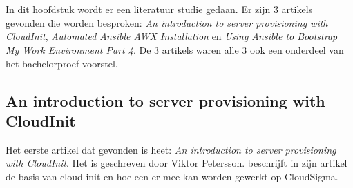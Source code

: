 \chapter{}
\label{ch:stand-van-zaken}






In dit hoofdstuk wordt er een literatuur studie gedaan. Er zijn 3 artikels gevonden die worden besproken: \textit{An introduction to server provisioning with CloudInit}, \textit{Automated Ansible AWX Installation} en \textit{Using Ansible to Bootstrap My Work Environment Part 4}. De 3 artikels waren alle 3 ook een onderdeel van het bachelorproef voorstel.

\section{An introduction to server provisioning with CloudInit}
Het eerste artikel dat gevonden is heet: \textit{An introduction to server provisioning with CloudInit}. Het is geschreven door Viktor Petersson. \autocite{viktorpet} beschrijft in zijn artikel de basis van cloud-init en hoe een er mee kan worden gewerkt op CloudSigma. 

